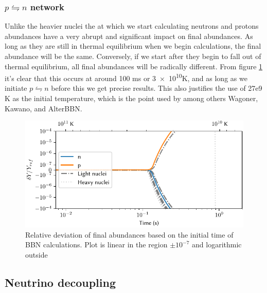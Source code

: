\subsubsection{$p\leftrightharpoons n$ network}
Unlike the heavier nuclei the at which we start calculating neutrons and protons abundances have a very abrupt and significant impact on final abundances. As long as they are still in thermal equilibrium when we begin calculations, the final abundance will be the same. Conversely, if we start after they begin to fall out of thermal equilibrium, all final abundances will be radically different. From figure \ref{fig:npnettime} it's clear that this occurs at around 100 ms or \num{3e10}K, and as long as we initiate $p\leftrightharpoons n$ before this we get precise results. This also justifies the use of 27e9 K as the initial temperature, which is the point used by among others Wagoner, Kawano, and AlterBBN.
\begin{figure}[ht]
    \includegraphics[width=5.1in]{figures/npnettime.pdf}
    \caption{Relative deviation of final abundances based on the initial time of BBN calculations. Plot is linear in the region $\pm 10^{-7}$ and logarithmic outside}
    \label{fig:npnettime}
\end{figure}



\subsection{Neutrino decoupling}

